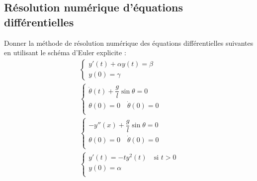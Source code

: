\documentclass[10pt]{article}
\begin{document}





 \renewcommand{\baselinestretch}{1}
\setlength{\parskip}{0ex plus 0.5ex minus 0.2ex}



\subsection*{Résolution numérique d'équations différentielles}

Donner la méthode de résolution numérique des équations différentielles suivantes en utilisant le schéma d'Euler explicite :
\begin{eqnarray}
\left\{
\begin{array}{l}
y'(t) + \alpha y(t) = \beta \\
y(0) = \gamma
\end{array}
\right. \\
\left\{
\begin{array}{l}
\ddot{\theta}(t) + \dfrac{g}{l}\sin \theta = 0\\
\theta(0) = 0 \quad \dot{\theta}(0) = 0 \\
\end{array} 
\right.\\
\left\{
\begin{array}{l}
-y''(x) + \dfrac{g}{l}\sin \theta = 0\\
\theta(0) = 0 \quad \dot{\theta}(0) = 0 \\
\end{array} 
\right.\\
\left\{
\begin{array}{l}
y'(t) = -ty^2(t) \quad \text{si }t>0\\
y(0) = \alpha  \\
\end{array} 
\right.
\end{eqnarray}
\end{document}
